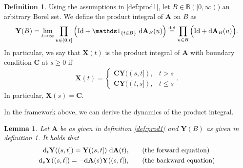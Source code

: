 \documentclass[12pt,letter,twoside]{article}
\theoremstyle{plain}
\newtheorem{lemma}[theorem]{Lemma}
\theoremstyle{definition}
\newtheorem{definition}[theorem]{Definition}
\theoremstyle{remark}
\begin{document}
\begin{definition}\label{def:prod2}
Using the assumptions in \ref{def:prod1}, let $B\in\mathbb B([0,\infty))$ an arbitrary Borel set. We define the product integral of $\mathbf A$ on $B$ as
\begin{align}
\mathbf Y(B)=\lim_{t\to\infty }\prod_{u\in (0,t]}\Big(\text{Id}+\mathds 1_{\{t\in B\}}\ \text d\mathbf A_B(u)\Big)\stackrel{\text{def}}{=}\prod_{u\in B}\Big(\text{Id}+\text d\mathbf A_B(u)\Big).
\end{align}
In particular, we say that $\mathbf X(t)$ is the product integral of $\mathbf A$ with boundary condition $\mathbf C$ at $s\ge 0$ if
\begin{align}
\mathbf X(t)=\begin{cases}
    \mathbf C \mathbf Y((s,t]), & t> s\\
    \mathbf C\mathbf Y((t,s]), & t\le s
\end{cases}.
\end{align}
In particular, $\mathbf X(s)=\mathbf C$.
\end{definition}
In the framework above, we can derive the dynamics of the product integral.
\begin{lemma}
Let $\mathbf A$ be as given in definition \ref{def:prod1} and $\mathbf Y(B)$ as given in definition \ref{def:prod2}. It holds that
\begin{align}
\text d_t \mathbf Y((s,t]) = \mathbf Y((s,t])\ \text d \mathbf A(t),\hspace{20pt}& \text{(the forward equation)}\\
\text d_s \mathbf Y((s,t])=-\text d\mathbf A(s)\mathbf Y((s,t]),\hspace{20pt}& \text{(the backward equation)}
\end{align}
\end{lemma}
\end{document}
